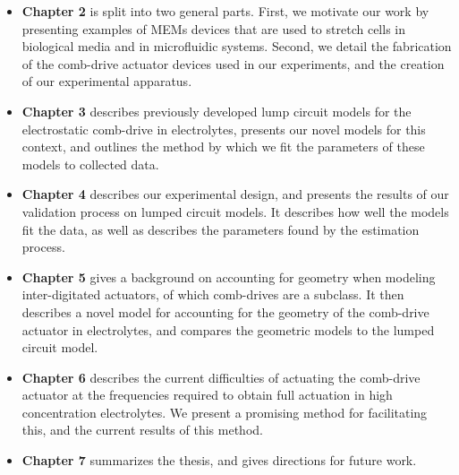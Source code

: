 \begin{itemize}
    \item \textbf{Chapter 2} is split into two general parts. First, we motivate our work by presenting examples of MEMs devices that are used to stretch cells in biological media and in microfluidic systems. Second, we detail the fabrication of the comb-drive actuator devices used in our experiments, and the creation of our experimental apparatus.
    \item \textbf{Chapter 3} describes previously developed lump circuit models for the electrostatic comb-drive in electrolytes, presents our novel models for this context, and outlines the method by which we fit the parameters of these models to collected data.
    \item \textbf{Chapter 4} describes our experimental design, and presents the results of our validation process on lumped circuit models. It describes how well the models fit the data, as well as describes the parameters found by the estimation process.
    \item \textbf{Chapter 5} gives a background on accounting for geometry when modeling inter-digitated actuators, of which comb-drives are a subclass. It then describes a novel model for accounting for the geometry of the comb-drive actuator in electrolytes, and compares the geometric models to the lumped circuit model.
    \item \textbf{Chapter 6} describes the current difficulties of actuating the comb-drive actuator at the frequencies required to obtain full actuation in high concentration electrolytes. We present a promising method for facilitating this, and the current results of this method.
    \item \textbf{Chapter 7} summarizes the thesis, and gives directions for future work.
\end{itemize}

 
